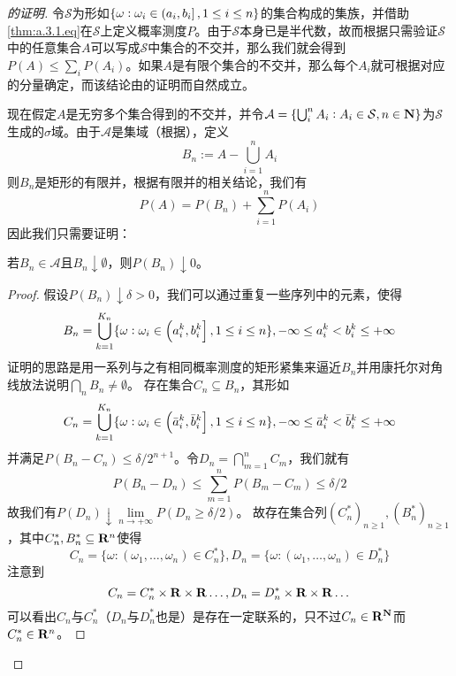 \documentclass[main.tex]{subfiles}
\begin{document}
\begin{proof}[的证明]
令\(\mathcal{S}\)为形如\(\{\omega:\omega_i \in \intoc{a_i,b_i},1\leq i\leq n\}\)的集合构成的集族，并借助\eqref{thm:a.3.1.eq}在\(\mathcal{S}\)上定义概率测度\(P\)。由于\(\mathcal{S}\)本身已是半代数，故而根据只需验证\(\mathcal{S}\)中的任意集合\(A\)可以写成\(\mathcal{S}\)中集合的不交并，那么我们就会得到\(P(A)\leq \sum_i P(A_i)\)。如果\(A\)是有限个集合的不交并，那么每个\(A_i\)就可根据对应的分量确定，而该结论由的证明而自然成立。

现在假定\(A\)是无穷多个集合得到的不交并，并令\(\mathcal{A} = \{\bigcup_i^n A_i: A_i \in \mathcal{S}, n \in \mathbf{N}\}\)为\(\mathcal{S}\)生成的\(\sigma\)域。由于\(\mathcal{A}\)是集域（根据），定义
\[B_n := A-\bigcup_{i=1}^n A_i\]
则\(B_n\)是矩形的有限并，根据有限并的相关结论，我们有
\[P(A) = P(B_n)+\sum_{i=1}^nP(A_i)\]
因此我们只需要证明：
\begin{lemma} \label{lem:a.3.3}
	若\(B_n \in \mathcal{A}\)且\(B_n \downarrow \emptyset\)，则\(P(B_n)\downarrow 0\)。
\end{lemma}
\begin{proof}
	假设\(P(B_n) \downarrow \delta > 0\)，我们可以通过重复一些序列中的元素，使得
	\[B_n = \bigcup_{k=1}^{K_n}\{\omega: \omega_i \in \intoc{a_i^k, b_i^k}, 1\leq i\leq n\}, -\infty\leq a_i^k<b_i^k \leq +\infty\]
	证明的思路是用一系列与之有相同概率测度的矩形紧集来逼近\(B_n\)并用康托尔对角线放法说明\(\bigcap_n B_n \neq \emptyset\)。
	存在集合\(C_n \subseteq B_n\)，其形如
	\[C_n = \bigcup_{k=1}^{K_n}\{\omega: \omega_i \in \intoc{\bar{a}_i^k, \bar{b}_i^k}, 1\leq i\leq n\}, -\infty\leq \bar{a}_i^k<\bar{b}_i^k \leq +\infty\]
	并满足\(P(B_n - C_n) \leq \delta/2^{n+1}\)。令\(D_n = \bigcap_{m=1}^n C_m\)，我们就有
	\[P(B_n-D_n)\leq\sum_{m=1}^n P(B_m-C_m) \leq \delta/2\]
	故我们有\(P(D_n)\downarrow\lim\limits_{n\rightarrow +\infty}P(D_n \geq \delta/2)\)。
	故存在集合列\((C_n^*)_{n\geq 1}, (B_n^*)_{n\geq 1}\)，其中\(C_n^*, B_n^* \subseteq \mathbf{R}^n\)使得
	\[C_n = \{\omega: (\omega_1, \dots, \omega_n) \in C_n^*\}, D_n = \{\omega: (\omega_1, \dots, \omega_n) \in D_n^*\}\]
	注意到
	\[C_n = C_n^*\times\mathbf{R}\times\mathbf{R}\dots, D_n = D_n^*\times\mathbf{R}\times\mathbf{R}\dots\]
	可以看出\(C_n\)与\(C_n^*\)（\(D_n\)与\(D_n^*\)也是）是存在一定联系的，只不过\(C_n \in \mathbf{R}^{\mathbf{N}}\)而\(C_n^* \in \mathbf{R}^n\)。


\end{proof}
\end{proof}
\end{document}

